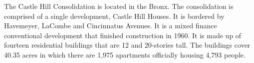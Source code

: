 The Castle Hill Consolidation is located in the Bronx. The consolidation is comprised of a single development, Castle Hill Houses. It is bordered by Havemeyer, LaCombe and Cincinnatus Avenues. It is a mixed finance conventional development that finished construction in 1960. It is made up of fourteen residential buildings that are 12 and 20-stories tall. The buildings cover 40.35 acres in which there are 1,975 apartments officially housing 4,793 people.